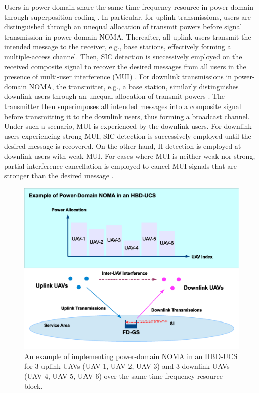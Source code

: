 Users in power-domain share the same time-frequency resource in power-domain through superposition coding \cite{islam2017power,dai2018survey,kader2018full,cui2016novel,salehi2019meta,ernest2019noma,liu2018heterogeneous,wang2017sir,kader2018coordinated,zhang2017downlink,ding2016general,ding2016impact,liang2017user}. In particular, for uplink transmissions, users are distinguished through an unequal allocation of transmit powers before signal transmission in power-domain NOMA. Thereafter, all uplink users transmit the intended message to the receiver, e.g., base stations, effectively forming a multiple-access channel. Then, SIC detection is successively employed on the received composite signal to recover the desired messages from all users in the presence of multi-user interference (MUI) \cite{cui2016novel,kader2018full,salehi2019meta,weber2007transmission,islam2017power}. For downlink transmissions in power-domain NOMA, the transmitter, e.g., a base station, similarly distinguishes downlink users through an unequal allocation of transmit powers \cite{islam2017power}. The transmitter then superimposes all intended messages into a composite signal before transmitting it to the downlink users, thus forming a broadcast channel. Under such a scenario, MUI is experienced by the downlink users. For downlink users experiencing strong MUI, SIC detection is successively employed until the desired message is recovered. On the other hand, II detection is employed at downlink users with weak MUI. For cases where MUI is neither weak nor strong, partial interference cancellation is employed to cancel MUI signals that are stronger than the desired message \cite{salehi2019meta,islam2017power}.

\begin{figure} [t]
\centering
\includegraphics [width=0.6\columnwidth]{chap2_fig/power_domain_NOMA_HBD_UCS_example.eps} 
\caption{An example of implementing power-domain NOMA in an HBD-UCS for 3 uplink UAVs (UAV-1, UAV-2, UAV-3) and 3 downlink UAVs (UAV-4, UAV-5, UAV-6) over the same time-frequency resource block.}
\label{fig:lit_review_power_domain_NOMA_HBD_UCS_example}
\end{figure}


